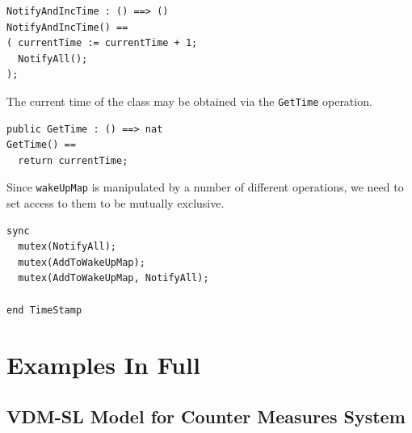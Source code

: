 \documentclass{overturerepchap}
\begin{document}
\begin{lstlisting}
NotifyAndIncTime : () ==> ()
NotifyAndIncTime() ==
( currentTime := currentTime + 1;
  NotifyAll();
);
\end{lstlisting}

The current time of the class may be obtained via the \texttt{GetTime}
operation.

\begin{lstlisting}
public GetTime : () ==> nat
GetTime() ==
  return currentTime;
\end{lstlisting}

Since \texttt{wakeUpMap} is manipulated by a number of different
operations, we need to set access to them to be mutually exclusive.

\begin{lstlisting}
sync
  mutex(NotifyAll);
  mutex(AddToWakeUpMap);
  mutex(AddToWakeUpMap, NotifyAll); 

end TimeStamp
\end{lstlisting}

\chapter{Examples In Full}\label{app:listing}

\section{VDM-SL Model for Counter Measures System}\label{app:VDMSLmodel}
\end{document}
